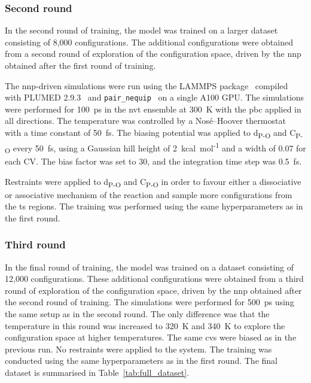 \subsubsection{Second round}
In the second round of training, the model was trained on a larger dataset consisting of 8,000 configurations. The additional configurations were obtained from a second round of exploration of the configuration space, driven by the \ac{nnp} obtained after the first round of training.

The \ac{nnp}-driven simulations were run using the LAMMPS package~\citep{thompsonLAMMPSFlexibleSimulation2022} compiled with PLUMED 2.9.3~\citep{tribelloPLUMED2New2014} and \texttt{pair\_nequip}~\citep{MirgroupPair_nequip} on a single A100 GPU. The simulations were performed for 100~ps in the \ac{nvt} ensemble at 300~K with the \ac{pbc} applied in all directions. The temperature was controlled by a Nos\'e--Hoover thermostat~\citep{noseUnifiedFormulationConstant1984, hooverCanonicalDynamicsEquilibrium1985} with a time constant of 50~fs. The biasing potential was applied to d\textsubscript{P-O} and C\textsubscript{P-O} every 50~fs, using a Gaussian hill height of 2~kcal~mol\textsuperscript{-1} and a width of 0.07 for each CV. The bias factor was set to 30, and the integration time step was 0.5~fs.

Restraints were applied to d\textsubscript{P-O} and C\textsubscript{P-O} in order to favour either a dissociative or associative mechanism of the reaction and sample more configurations from the \ac{ts} regions. The training was performed using the same hyperparameters as in the first round.



\subsubsection{Third round}
In the final round of training, the model was trained on a dataset consisting of 12,000 configurations. These additional configurations were obtained from a third round of exploration of the configuration space, driven by the \ac{nnp} obtained after the second round of training. The simulations were performed for 500~ps using the same setup as in the second round. The only difference was that the temperature in this round was increased to 320~K and 340~K to explore the configuration space at higher temperatures. The same \acp{cv} were biased as in the previous run. No restraints were applied to the system. The training was conducted using the same hyperparameters as in the first round. The final dataset is summarised in Table~\ref{tab:full_dataset}.



